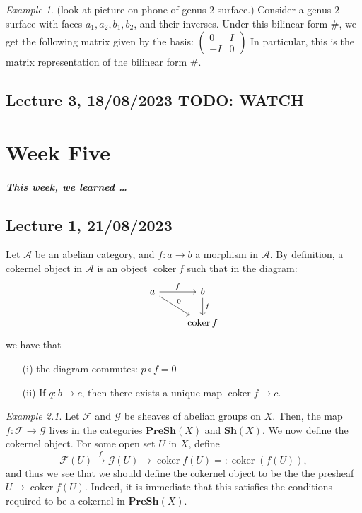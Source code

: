 \documentclass[a4paper]{report}
\theoremstyle{definition}
\theoremstyle{remark}
\theoremstyle{proposition}
\theoremstyle{conjecture}
\theoremstyle{lemma}
\theoremstyle{corollary}
\theoremstyle{exercise}
\theoremstyle{example}
\newtheorem{example}{Example}
\newcommand{\mcal}{\mathcal}
\newcommand{\on}{\operatorname}
\begin{document}
\begin{example}
    (look at picture on phone of genus $2$  surface.)
    Consider a genus $2$ surface with faces 
    $a_1,a_2,b_1,b_2$, and their inverses. Under this bilinear form $\#$, 
    we get the following matrix given by the basis:
     $\begin{pmatrix}
        0&I\\
        -I&0
    \end{pmatrix}$
    In particular, this is the matrix representation of the bilinear form
     $\#$.
\end{example}

\section{Lecture 3, 18/08/2023 TODO: WATCH}

\chapter{Week Five}

\paragraph{This week, we learned \ldots}

\section{Lecture 1, 21/08/2023}

Let $\mcal{A}$ be an abelian category, and $f: a \to b$ a morphism in 
$\mcal{A}$. By definition, a cokernel object in $\mcal{A}$ is an object
$\on{coker} f$ such that in the diagram:
$$\begin{tikzcd}
a \arrow[r, "f"] \arrow[rd, "0"] & b \arrow[d, "f"] \\
                                 & \on{coker}f     
\end{tikzcd}$$
we have that 
\begin{itemize}
    \item[(i)] the diagram commutes: $p\circ f= 0$
    \item[(ii)] If $q : b \to c$, then there exists a unique map 
        $\on{coker} f \to c$.
\end{itemize}

\begin{example}
    Let $\mcal{F}$ and $\mcal{G}$ be sheaves of abelian groups on $X$. Then, 
    the map $f : \mcal{F} \to \mcal{G}$ lives in the categories
    $\mathbf{PreSh}(X)$ and $\mathbf{Sh}(X)$.
    We now define the cokernel object. For some open set $U$ in $X$, 
    define $$\mcal{F}(U) \stackrel{f}{\longrightarrow}\mcal{G}(U) \longrightarrow \on{coker}f(U)=:\on{coker}(f(U)),$$
    and thus we see that we should define the cokernel object to be the 
    the presheaf $U\mapsto \on{coker}f(U)$. 
    Indeed, it is immediate that this satisfies the conditions required to 
    be a cokernel in $\mathbf{PreSh}(X)$. 
\end{example}
\end{document}
